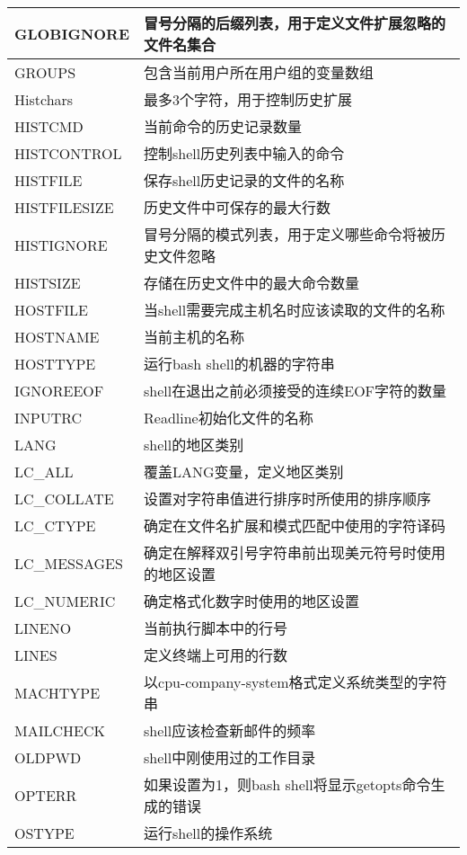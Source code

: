 \documentclass[a4paper,left=2.5cm,right=2.5cm,11pt]{article}
\begin{document}
\begin{longtable}{p{3cm}p{9cm}}
	\hline
	GLOBIGNORE & 冒号分隔的后缀列表，用于定义文件扩展忽略的文件名集合 \\
	\hline
	GROUPS & 包含当前用户所在用户组的变量数组 \\
	\hline
	Histchars & 最多3个字符，用于控制历史扩展 \\
	\hline
	HISTCMD & 当前命令的历史记录数量 \\
	\hline
	HISTCONTROL & 控制shell历史列表中输入的命令 \\
	\hline
	HISTFILE & 保存shell历史记录的文件的名称 \\
	\hline
	HISTFILESIZE & 历史文件中可保存的最大行数 \\
	\hline
	HISTIGNORE & 冒号分隔的模式列表，用于定义哪些命令将被历史文件忽略 \\
	\hline
	HISTSIZE & 存储在历史文件中的最大命令数量 \\
	\hline
	HOSTFILE & 当shell需要完成主机名时应该读取的文件的名称 \\
	\hline
	HOSTNAME & 当前主机的名称 \\
	\hline
	HOSTTYPE & 运行bash shell的机器的字符串 \\
	\hline
	IGNOREEOF & shell在退出之前必须接受的连续EOF字符的数量 \\
	\hline
	INPUTRC & Readline初始化文件的名称 \\
	\hline
	LANG & shell的地区类别 \\
	\hline
	LC\_ALL & 覆盖LANG变量，定义地区类别 \\
	\hline
	LC\_COLLATE & 设置对字符串值进行排序时所使用的排序顺序 \\
	\hline
	LC\_CTYPE & 确定在文件名扩展和模式匹配中使用的字符译码 \\
	\hline
	LC\_MESSAGES & 确定在解释双引号字符串前出现美元符号时使用的地区设置 \\
	\hline
	LC\_NUMERIC & 确定格式化数字时使用的地区设置 \\
	\hline
	LINENO & 当前执行脚本中的行号 \\
	\hline
	LINES & 定义终端上可用的行数 \\
	\hline
	MACHTYPE & 以cpu-company-system格式定义系统类型的字符串 \\
	\hline
	MAILCHECK & shell应该检查新邮件的频率 \\
	\hline
	OLDPWD & shell中刚使用过的工作目录 \\
	\hline
	OPTERR & 如果设置为1，则bash shell将显示getopts命令生成的错误 \\
	\hline
	OSTYPE & 运行shell的操作系统 \\
	\hline

\end{longtable}
\end{document}
